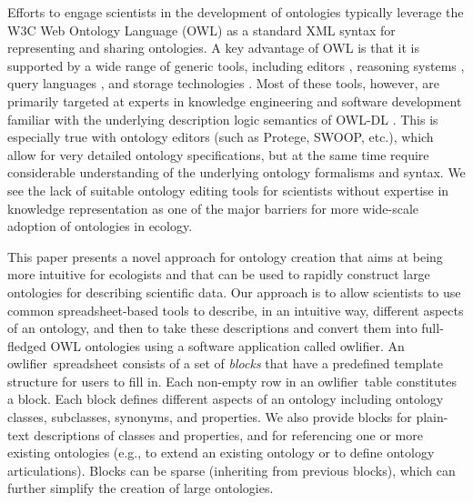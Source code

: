 \documentclass[preprint,number]{elsarticle}
\newcommand{\owlifier}{\textsf{owlifier}}
\begin{document}
Efforts to engage scientists in the development of ontologies
typically leverage the W3C Web Ontology Language (OWL)
\cite{smith04:_owl_web_ontol_languag_guide} as a standard XML syntax
for representing and sharing ontologies. A key advantage of OWL is
that it is supported by a wide range of generic tools, including
editors
\cite{knublauch04:_editin_descr_logic_ontol_with,kalyanpur05:_swoop},
reasoning systems
\cite{sirin07:_pellet,tsarkov06:_fact_descr_logic_reason}, query
languages
\cite{prudhommeaux08:_sparq_query_languag_for_rdf,motik05:_query_answer_for_owl_dl_with_rules},
and storage technologies
\cite{carroll04:_jena,broekstra02:_sesam}. Most of these tools,
however, are primarily targeted at experts in knowledge engineering
and software development familiar with the underlying description
logic semantics of OWL-DL \cite{grau08:_owl}. This is especially true
with ontology editors (such as Protege, SWOOP, etc.), which allow for
very detailed ontology specifications, but at the same time require
considerable understanding of the underlying ontology formalisms and
syntax. We see the lack of suitable ontology editing tools for
scientists without expertise in knowledge representation as one of the
major barriers for more wide-scale adoption of ontologies in ecology.


This paper presents a novel approach for ontology creation that aims
at being more intuitive for ecologists and that can be used to rapidly
construct large ontologies for describing scientific data. Our
approach is to allow scientists to use common spreadsheet-based tools
to describe, in an intuitive way, different aspects of an ontology,
and then to take these descriptions and convert them into full-fledged
OWL ontologies using a software application called \owlifier. An
\owlifier\ spreadsheet consists of a set of \emph{blocks} that have a
predefined template structure for users to fill in. Each non-empty row
in an \owlifier\ table constitutes a block. Each block defines
different aspects of an ontology including ontology classes,
subclasses, synonyms, and properties.  We also provide blocks for
plain-text descriptions of classes and properties, and for referencing
one or more existing ontologies (e.g., to extend an existing ontology
or to define ontology articulations). Blocks can be sparse (inheriting
from previous blocks), which can further simplify the creation of
large ontologies.
\end{document}
